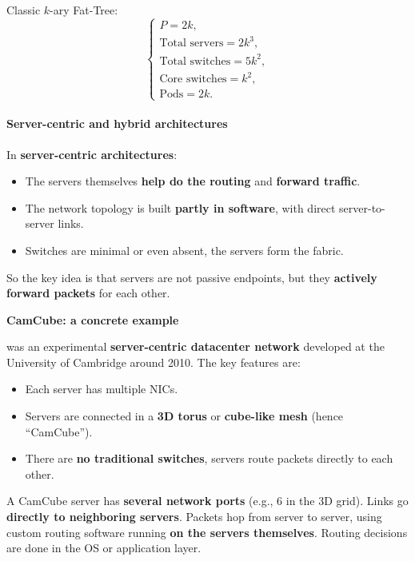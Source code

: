 \begin{examplebox}[: Fat-Tree with $2k$ pods and $k=2$]
    Classic $k$-ary Fat-Tree:
    \begin{equation*}
        \begin{cases}
            P = 2k, \\
            \text{Total servers} = 2k^3, \\
            \text{Total switches} = 5k^2, \\
            \text{Core switches} = k^2, \\
            \text{Pods} = 2k.
        \end{cases}
    \end{equation*}
\end{examplebox}

\newpage

\paragraph{Server-centric and hybrid architectures}

In \textbf{server-centric architectures}:
\begin{itemize}
    \item The servers themselves \textbf{help do the routing} and \textbf{forward traffic}.
    \item The network topology is built \textbf{partly in software}, with direct server-to-server links.
    \item Switches are minimal or even absent, the servers form the fabric.
\end{itemize}
So the key idea is that servers are not passive endpoints, but they \textbf{actively forward packets} for each other.

\highspace
\begin{flushleft}
    \textcolor{Green3}{ \textbf{CamCube: a concrete example}}
\end{flushleft}
 was an experimental \textbf{server-centric datacenter network} developed at the University of Cambridge around 2010. The key features are:
\begin{itemize}
    \item Each server has multiple NICs.
    \item Servers are connected in a \textbf{3D torus} or \textbf{cube-like mesh} (hence ``CamCube'').
    \item There are \textbf{no traditional switches}, servers route packets directly to each other.
\end{itemize}
A CamCube server has \textbf{several network ports} (e.g., 6 in the 3D grid). Links go \textbf{directly to neighboring servers}. Packets hop from server to server, using custom routing software running \textbf{on the servers themselves}. Routing decisions are done in the OS or application layer.

